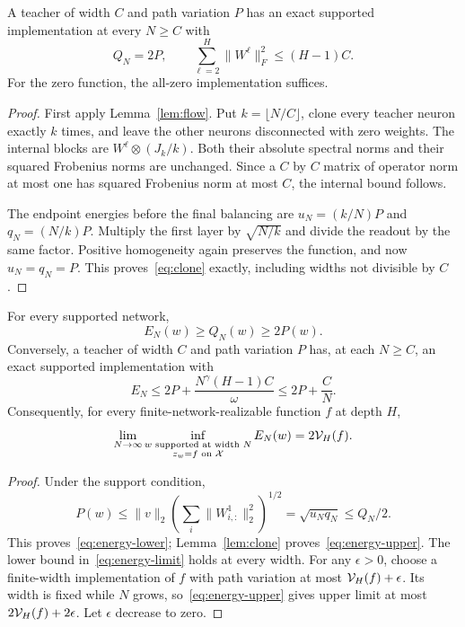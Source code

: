 \begin{lemma}
\label{lem:clone}
A teacher of width $C$ and path variation $P$ has an exact supported implementation at every $N\ge C$ with
\begin{equation}
 Q_N=2P,\qquad
 \sum_{\ell=2}^H\|W^\ell\|_F^2\le(H-1)C.
 \label{eq:clone}
\end{equation}
For the zero function, the all-zero implementation suffices.
\end{lemma}
\begin{proof}
First apply Lemma~\ref{lem:flow}. Put $k=\lfloor N/C\rfloor$, clone every teacher neuron exactly $k$ times, and leave the other neurons disconnected with zero weights. The internal blocks are $W^\ell\otimes(J_k/k)$. Both their absolute spectral norms and their squared Frobenius norms are unchanged. Since a $C$ by $C$ matrix of operator norm at most one has squared Frobenius norm at most $C$, the internal bound follows.

The endpoint energies before the final balancing are $u_N=(k/N)P$ and $q_N=(N/k)P$. Multiply the first layer by $\sqrt{N/k}$ and divide the readout by the same factor. Positive homogeneity again preserves the function, and now $u_N=q_N=P$. This proves~\eqref{eq:clone} exactly, including widths not divisible by $C$.
\end{proof}

\begin{theorem}
\label{thm:energy-characterization}
For every supported network,
\begin{equation}
 E_N(w)\ge Q_N(w)\ge2P(w).
 \label{eq:energy-lower}
\end{equation}
Conversely, a teacher of width $C$ and path variation $P$ has, at each $N\ge C$, an exact supported implementation with
\begin{equation}
 E_N\le2P+\frac{N^\gamma(H-1)C}{\omega}\le2P+\frac CN.
 \label{eq:energy-upper}
\end{equation}
Consequently, for every finite-network-realizable function $f$ at depth $H$,
\begin{equation}
 \lim_{N\to\infty}\inf_{\substack{w\text{ supported at width }N\\z_w=f\text{ on }\mathcal X}}E_N(w)
 =2\mathcal V_H(f).
 \label{eq:energy-limit}
\end{equation}
\end{theorem}
\begin{proof}
Under the support condition,
\[
 P(w)\le\|v\|_2\left(\sum_i\|W^1_{i,:}\|_2^2\right)^{1/2}
          =\sqrt{u_Nq_N}\le Q_N/2.
\]
This proves~\eqref{eq:energy-lower}; Lemma~\ref{lem:clone} proves~\eqref{eq:energy-upper}. The lower bound in~\eqref{eq:energy-limit} holds at every width. For any $\epsilon>0$, choose a finite-width implementation of $f$ with path variation at most $\mathcal V_H(f)+\epsilon$. Its width is fixed while $N$ grows, so~\eqref{eq:energy-upper} gives upper limit at most $2\mathcal V_H(f)+2\epsilon$. Let $\epsilon$ decrease to zero.
\end{proof}
